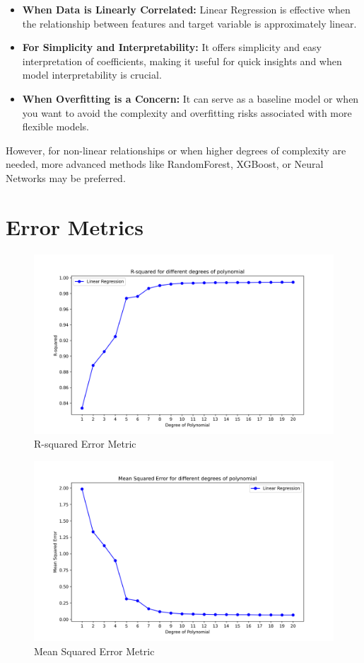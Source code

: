 \begin{itemize}
    \item \textbf{When Data is Linearly Correlated:} Linear Regression is effective when the relationship between features and target variable is approximately linear.
    \item \textbf{For Simplicity and Interpretability:} It offers simplicity and easy interpretation of coefficients, making it useful for quick insights and when model interpretability is crucial.
    \item \textbf{When Overfitting is a Concern:} It can serve as a baseline model or when you want to avoid the complexity and overfitting risks associated with more flexible models.
\end{itemize}

However, for non-linear relationships or when higher degrees of complexity are needed, more advanced methods like RandomForest, XGBoost, or Neural Networks may be preferred.

\clearpage

\section*{Error Metrics}

\begin{figure}[H]
    \centering
    \includegraphics[width=0.5\linewidth]{./Images/R-squared.png}
    \caption{R-squared Error Metric}
\end{figure}

\begin{figure}[H]
    \centering
    \includegraphics[width=0.5\linewidth]{./Images/MSE.png}
    \caption{Mean Squared Error Metric}
\end{figure}

